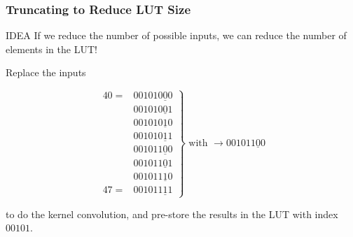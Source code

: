 \documentclass{beamer}
\begin{document}
\begin{frame}\frametitle{Truncating to Reduce LUT Size}
\begin{beamerboxesrounded}[lower=eeks2,upper=eecks,
shadow=true]{IDEA}
If we reduce the number of possible inputs, we can reduce the number of elements in the LUT!
\end{beamerboxesrounded}

\pause\begin{solution}Replace the inputs

\[
\left.
\begin{matrix}
 40 = &00101\underline{000}\\
 &00101\underline{001}\\
 &00101\underline{010}\\
 &00101\underline{011}\\
 &00101\underline{100}\\
 &00101\underline{101}\\
 &00101\underline{110}\\
 47 = &00101\underline{111} 
 \end{matrix}
\right\}
\text{ with }\longrightarrow
00101\underline{100}
\]

to do the kernel convolution, and pre-store the results in the LUT with index $00101$.
\end{solution}

\end{frame}
\end{document}
